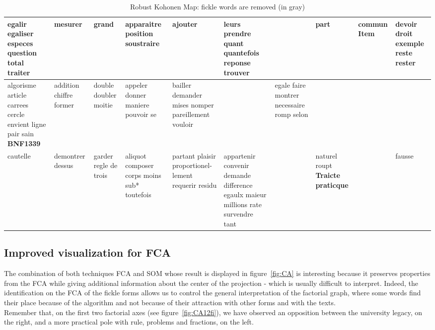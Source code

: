 \documentclass{elsarticle}
\begin{document}
\begin{table}[ht!]
{\begin{tabular}{|p{1.9cm}|p{1.9cm}|p{1.9cm}|p{1.9cm}|p{1.9cm}|p{1.9cm}|p{1.9cm}|p{1.9cm}|p{1.9cm}|p{1.9cm}|}
\hline
egalir egaliser especes question total traiter & mesurer & grand & apparaitre  \textcolor{gris}{position}  \textcolor{gris}{soustraire} &  \textcolor{gris}{ajouter} & leurs prendre quant quantefois reponse trouver & &  \textcolor{gris}{part} & commun Item & devoir  \textcolor{gris}{droit}  \textcolor{gris}{exemple} reste rester\\
\hline
algorisme article carrees cercle envient ligne pair sain \cellcolor{grisclair} \textbf{BNF1339} & addition chiffre former &  \textcolor{gris}{double}  \textcolor{gris}{doubler} moitie & appeler  \textcolor{gris}{donner}  \textcolor{gris}{maniere}  \textcolor{gris}{pouvoir}  \textcolor{gris}{se}& bailler demander mises nomper pareillement vouloir & & egale faire montrer necessaire romp selon & & & \\
\hline
cautelle & demontrer dessus &  \textcolor{gris}{garder}  \textcolor{gris}{regle}  \textcolor{gris}{de}  \textcolor{gris}{trois} & aliquot composer corps moins sub* toutefois & partant plaisir proportionel- lement requerir residu & appartenir convenir demande difference egaulx maieur millions rate survendre tant & & naturel roupt \cellcolor{grisclair} \textbf{Traicte praticque} & & fausse\\
\hline
\end{tabular}
}
\label{fig:koho3}
\caption{Robust Kohonen Map: fickle words are removed (in gray)}
\end{table}

\subsection{Improved visualization for FCA}

The combination of both techniques FCA and SOM whose result is displayed in figure~\ref{fig:CA} is interesting because it preserves properties from the FCA while giving additional information about the center of the projection - which is usually difficult to interpret. Indeed, the identification on the FCA of the fickle forms allows us to control the general interpretation of the factorial graph, where some words find their place because of the algorithm and not because of their attraction with other forms and with the texts.\\

Remember that, on the first two factorial axes (see figure~\ref{fig:CA12fi}), we have observed an opposition between the university legacy, on the right, and a more practical pole with rule, problems and fractions, on the left.\\
\end{document}
